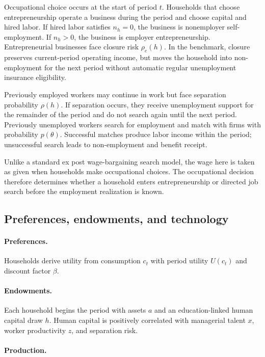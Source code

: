 Occupational choice occurs at the start of period $t$. Households that choose
entrepreneurship operate a business during the period and choose capital and
hired labor. If hired labor satisfies $n_h = 0$, the business is nonemployer
self-employment. If $n_h > 0$, the business is employer entrepreneurship.
Entrepreneurial businesses face closure risk $\rho_e(h)$. In the benchmark,
closure preserves current-period operating income, but moves the household into
non-employment for the next period without automatic regular unemployment
insurance eligibility.

Previously employed workers may continue in work but face separation
probability $\rho(h)$. If separation occurs, they receive unemployment support
for the remainder of the period and do not search again until the next period.
Previously unemployed workers search for employment and match with firms with
probability $p(\theta)$. Successful matches produce labor income within the
period; unsuccessful search leads to non-employment and benefit receipt.

Unlike a standard ex post wage-bargaining search model, the wage here is taken
as given when households make occupational choices. The occupational decision
therefore determines whether a household enters entrepreneurship or directed job
search before the employment realization is known.

\subsection{Preferences, endowments, and technology}

\paragraph{Preferences.}

Households derive utility from consumption $c_t$ with period utility
$U(c_t)$ and discount factor $\beta$.

\paragraph{Endowments.}

Each household begins the period with assets $a$ and an education-linked human
capital draw $h$. Human capital is positively correlated with managerial talent
$x$, worker productivity $z$, and separation risk.

\paragraph{Production.}

